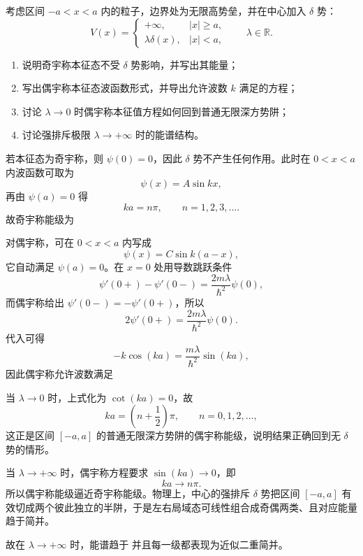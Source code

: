 ﻿

\begin{question}
考虑区间 $-a<x<a$ 内的粒子，边界处为无限高势垒，并在中心加入 $\delta$ 势：
\[
V(x)=
\begin{cases}
+\infty,& |x|\ge a,\\
\lambda\delta(x),& |x|<a,
\end{cases}
\qquad \lambda\in\mathbb R.
\]

\begin{enumerate}[label=(\arabic*),leftmargin=2.5em]
  \item 说明奇宇称本征态不受 $\delta$ 势影响，并写出其能量；
  \item 写出偶宇称本征态波函数形式，并导出允许波数 $k$ 满足的方程；
  \item 讨论 $\lambda\to 0$ 时偶宇称本征值方程如何回到普通无限深方势阱；
  \item 讨论强排斥极限 $\lambda\to +\infty$ 时的能谱结构。
\end{enumerate}

\begin{solution}
若本征态为奇宇称，则 $\psi(0)=0$，因此 $\delta$ 势不产生任何作用。此时在 $0<x<a$ 内波函数可取为
\[
\psi(x)=A\sin kx,
\]
再由 $\psi(a)=0$ 得
\[
ka=n\pi,
\qquad n=1,2,3,\dots.
\]
故奇宇称能级为

对偶宇称，可在 $0<x<a$ 内写成
\[
\psi(x)=C\sin k(a-x),
\]
它自动满足 $\psi(a)=0$。在 $x=0$ 处用导数跳跃条件
\[
\psi'(0+)-\psi'(0-)=\frac{2m\lambda}{\hbar^2}\psi(0),
\]
而偶宇称给出 $\psi'(0-)=-\psi'(0+)$，所以
\[
2\psi'(0+)=\frac{2m\lambda}{\hbar^2}\psi(0).
\]
代入可得
\[
-k\cos(ka)=\frac{m\lambda}{\hbar^2}\sin(ka),
\]
因此偶宇称允许波数满足

当 $\lambda\to 0$ 时，上式化为 $\cot(ka)=0$，故
\[
ka=\left(n+\frac12\right)\pi,
\qquad n=0,1,2,\dots,
\]
这正是区间 $[-a,a]$ 的普通无限深方势阱的偶宇称能级，说明结果正确回到无 $\delta$ 势的情形。

当 $\lambda\to +\infty$ 时，偶宇称方程要求 $\sin(ka)\to 0$，即
\[
ka\to n\pi.
\]
所以偶宇称能级逼近奇宇称能级。物理上，中心的强排斥 $\delta$ 势把区间 $[-a,a]$ 有效切成两个彼此独立的半阱，于是左右局域态可线性组合成奇偶两类、且对应能量趋于简并。

故在 $\lambda\to +\infty$ 时，能谱趋于
并且每一级都表现为近似二重简并。
\end{solution}
\end{question}

